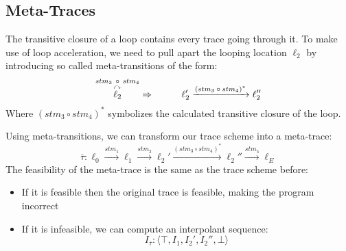 \documentclass{article}
\begin{document}
\begin{figure}[H]
\end{figure}

\subsection{Meta-Traces}
The transitive closure of a loop contains every trace going through it. To make use of loop acceleration, we need to pull apart the looping location $\ell_2$ by introducing so called meta-transitions of the form:
\begin{equation*}
\overset{stm_3\ \circ \ stm_4}{\overset{\curvearrowright}{\ell_2}} \Rightarrow \hspace*{1cm} \ell_2' \xrightarrow{\text{$(stm_3 \circ stm_4)^*$}} \ell_2''
\end{equation*}
Where $(stm_3 \circ stm_4)^*$ symbolizes the calculated transitive closure of the loop. \par
Using meta-transitions, we can transform our trace scheme into a meta-trace:
\begin{equation*}
\bar{\tau}: \ell_0 \xrightarrow{\text{$stm_1$}} \ell_1 \xrightarrow{\text{$stm_2$}} \ell_2' \xrightarrow{\text{$(stm_3 \circ stm_4)^*$}} \ell_2'' \xrightarrow{\text{$stm_5$}} \ell_E
\end{equation*}
The feasibility of the meta-trace is the same as the trace scheme before: \\
\begin{itemize}
	\item  If it is feasible then the original trace is feasible, making the program incorrect
	\item If it is infeasible, we can compute an interpolant sequence: \\
	\begin{equation*}
	I_{\bar{\tau}}: \langle \top, I_1, I_2', I_2'', \bot  \rangle
	\end{equation*}
\end{itemize}
\end{document}
